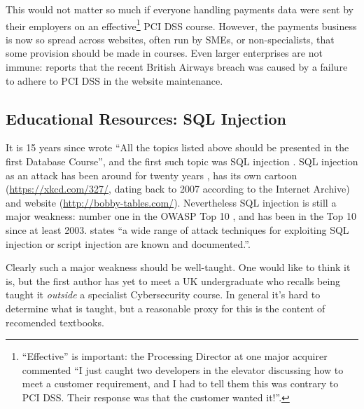 \documentclass[conference]{IEEEtran}
\begin{document}
This would not matter so much if everyone handling payments data were sent by their employers on an effective\footnote{``Effective'' is important: the Processing Director at one major acquirer commented ``I just caught two developers in the elevator discussing how to meet a customer requirement, and I had to tell them this was contrary to PCI DSS. Their response was that the customer wanted it!''.} PCI DSS course. However, the payments business is now so spread across websites, often run by SMEs, or non-specialists, that some provision should be made in courses.  Even larger enterprises are not immune: \cite{Barth2018a} reports that the recent British Airways breach was caused by a failure to adhere to PCI DSS in the website maintenance.



\subsection{Educational Resources: SQL Injection}\label{sec:SQL}
It is 15 years since \cite{Guimaraesetal2004} 
wrote ``All the topics listed above should be presented in the first
Database Course'', and the first such topic was SQL injection \cite{SPIDynamics2002,Anonymous2018b}. SQL injection as an attack has been around for twenty years \cite{HornerHyslip2017a}, has its own cartoon (\url{https://xkcd.com/327/}, dating back to 2007 according to the Internet Archive) and website (\url{http://bobby-tables.com/}). Nevertheless SQL injection is still a major weakness: number one in the OWASP Top 10 \cite{OWASP2017a}, and has been in the Top 10 since at least 2003.  \cite[the UK's definitive reference]{Bristol2018a} states ``a wide range of attack techniques for exploiting SQL
injection or script injection are known and documented.''.

Clearly such a major weakness should be well-taught. One would like to think it is, but the first author has yet to meet a UK undergraduate who recalls being taught it \emph{outside} a specialist Cybersecurity course.  In general it's hard to determine what is taught, but a reasonable proxy for this is the content of recomended textbooks. 
\end{document}
